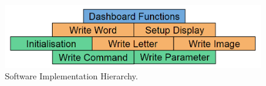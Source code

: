 \begin{figure}[H]
\begin{center}
\includegraphics[width=12cm]{Figures/software_hierarchy.png}
\end{center}
\caption{Software Implementation Hierarchy.}
\label{fig:software_hierarchy}
\end{figure}
